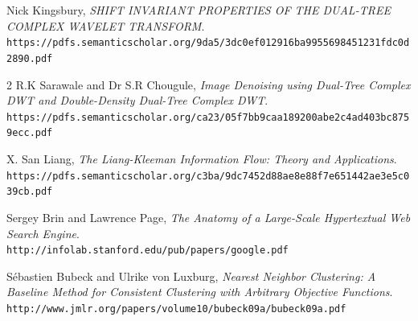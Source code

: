 \documentclass[10pt,a4paper,oneside]{article}
\begin{document}
 
\begin{thebibliography}{9}
      Nick Kingsbury,
      \emph{SHIFT INVARIANT PROPERTIES OF THE DUAL-TREE COMPLEX WAVELET TRANSFORM}.
        \\\texttt{https://pdfs.semanticscholar.org/9da5/3dc0ef012916ba9955698451231fdc0d2890.pdf}

      2 R.K Sarawale and Dr S.R Chougule,
      \emph{Image Denoising using Dual-Tree Complex DWT and Double-Density Dual-Tree Complex DWT}.
        \\\texttt{https://pdfs.semanticscholar.org/ca23/05f7bb9caa189200abe2c4ad403bc8759ecc.pdf}

      X. San Liang,
      \emph{The Liang-Kleeman Information Flow: Theory and Applications}.
        \\\texttt{https://pdfs.semanticscholar.org/c3ba/9dc7452d88ae8e88f7e651442ae3e5c039cb.pdf}
        
      Sergey Brin and Lawrence Page,
      \emph{The Anatomy of a Large-Scale Hypertextual Web Search Engine}.
        \\\texttt{http://infolab.stanford.edu/pub/papers/google.pdf}

      Sébastien Bubeck and Ulrike von Luxburg,
      \emph{Nearest Neighbor Clustering: A Baseline Method for Consistent Clustering with Arbitrary Objective Functions}.
        \\\texttt{http://www.jmlr.org/papers/volume10/bubeck09a/bubeck09a.pdf} 


\end{thebibliography}
\end{document}
